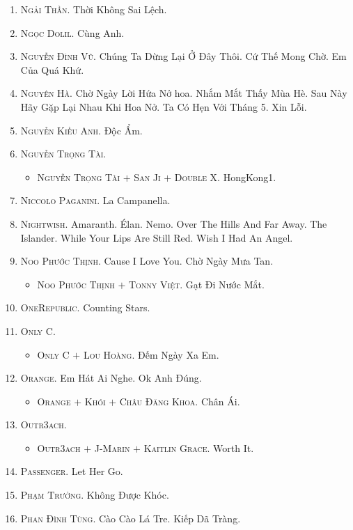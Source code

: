 \documentclass{article}
\begin{document}
\begin{enumerate}
	\item \textsc{Ngải Thần.} Thời Không Sai Lệch.
	\item \textsc{Ngọc Dolil.} Cùng Anh.
	\item \textsc{Nguyễn Đình Vũ.} Chúng Ta Dừng Lại Ở Đây Thôi. Cứ Thế Mong Chờ. Em Của Quá Khứ.
	\item \textsc{Nguyên Hà.} Chờ Ngày Lời Hứa Nở hoa. Nhắm Mắt Thấy Mùa Hè. Sau Này Hãy Gặp Lại Nhau Khi Hoa Nở. Ta Có Hẹn Với Tháng 5. Xin Lỗi.
	\item \textsc{Nguyễn Kiều Anh.} Độc Ẩm.
	\item \textsc{Nguyễn Trọng Tài.}
	\begin{itemize}
		\item \textsc{Nguyễn Trọng Tài $+$ San Ji $+$ Double X.} HongKong1.
	\end{itemize}
	\item \textsc{Niccolo Paganini.} La Campanella.
	\item \textsc{Nightwish.} Amaranth. \'Elan. Nemo. Over The Hills And Far Away. The Islander. While Your Lips Are Still Red. Wish I Had An Angel.
	\item \textsc{Noo Phước Thịnh.} Cause I Love You. Chờ Ngày Mưa Tan.
	\begin{itemize}
		\item \textsc{Noo Phước Thịnh $+$ Tonny Việt.} Gạt Đi Nước Mắt.
	\end{itemize}
	\item \textsc{OneRepublic.} Counting Stars.
	\item \textsc{Only C.}
	\begin{itemize}
		\item \textsc{Only C $+$ Lou Hoàng.} Đếm Ngày Xa Em.
	\end{itemize}
	\item \textsc{Orange.} Em Hát Ai Nghe. Ok Anh Đúng.
	\begin{itemize}
		\item \textsc{Orange $+$ Khói $+$ Châu Đăng Khoa.} Chân Ái.
	\end{itemize}
	\item \textsc{Outr3ach.}
	\begin{itemize}
		\item \textsc{Outr3ach $+$ J-Marin $+$ Kaitlin Grace.} Worth It.
	\end{itemize}
	\item \textsc{Passenger.} Let Her Go.
	\item \textsc{Phạm Trưởng.} Không Được Khóc.
	\item \textsc{Phan Đình Tùng.} Cào Cào Lá Tre. Kiếp Dã Tràng.

\end{enumerate}
\end{document}
